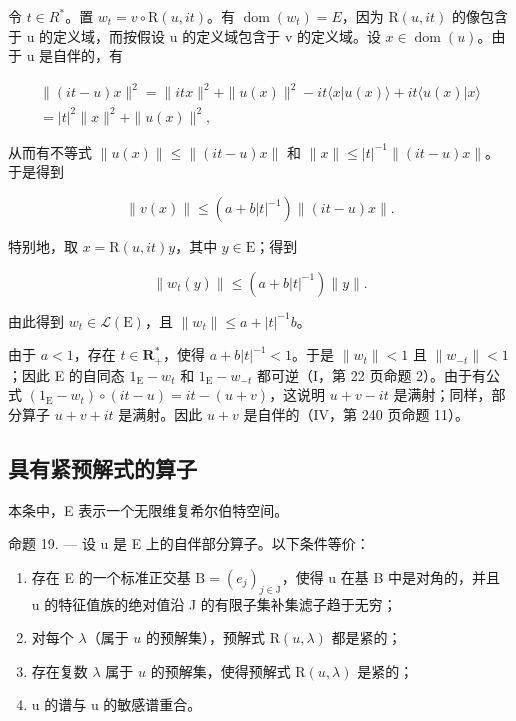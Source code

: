 令 \(t \in R^{*}\)。置 \(w_{t} = v \circ \mathrm{R}(u, it)\)。有 \(\operatorname{dom}(w_{t}) = E\)，因为 \(\mathrm{R}(u, it)\) 的像包含于 u 的定义域，而按假设 u 的定义域包含于 v 的定义域。设 \(x \in \operatorname{dom}(u)\)。由于 u 是自伴的，有

\[
\begin{array}{c} \| (i t - u) x \| ^ {2} = \| i t x \| ^ {2} + \| u (x) \| ^ {2} - i t \langle x | u (x) \rangle + i t \langle u (x) | x \rangle \\ = | t | ^ {2} \| x \| ^ {2} + \| u (x) \| ^ {2}, \end{array}
\]

从而有不等式 \(\|u(x)\|\leqslant\|(it-u)x\|\) 和 \(\|x\|\leqslant|t|^{-1}\|(it-u)x\|\)。于是得到

\[
\| v (x) \| \leqslant (a + b | t | ^ {- 1}) \| (i t - u) x \|.
\]

特别地，取 \(x = \mathrm{R}(u, it)y\)，其中 \(y \in \mathrm{E}\)；得到

\[
\| w _ {t} (y) \| \leqslant (a + b | t | ^ {- 1}) \| y \|.
\]

由此得到 \(w_{t}\in\mathcal{L}(\mathrm{E})\)，且 \(\|w_{t}\|\leqslant a+|t|^{-1}b\)。

由于 \(a < 1\)，存在 \(t \in \mathbf{R}_{+}^{*}\)，使得 \(a + b|t|^{-1} < 1\)。于是 \(\|w_{t}\| < 1\) 且 \(\|w_{-t}\| < 1\)；因此 E 的自同态 \(1_{\mathrm{E}} - w_{t}\) 和 \(1_{\mathrm{E}} - w_{-t}\) 都可逆（I，第 22 页命题 2）。由于有公式 \((1_{\mathrm{E}} - w_{t}) \circ (it - u) = it - (u + v)\)，这说明 \(u + v - it\) 是满射；同样，部分算子 \(u + v + it\) 是满射。因此 \(u + v\) 是自伴的（IV，第 240 页命题 11）。

\subsection{具有紧预解式的算子}

本条中，E 表示一个无限维复希尔伯特空间。

命题 19. --- 设 u 是 E 上的自伴部分算子。以下条件等价：

\begin{enumerate}
\def\labelenumi{(\roman{enumi})}
\item
  存在 E 的一个标准正交基 \(\mathrm{B} = (e_{j})_{j \in \mathrm{J}}\)，使得 u 在基 B 中是对角的，并且 u 的特征值族的绝对值沿 J 的有限子集补集滤子趋于无穷；
\item
  对每个 \(\lambda\)（属于 \(u\) 的预解集），预解式 \(\mathrm{R}(u,\lambda)\) 都是紧的；
\item
  存在复数 \(\lambda\) 属于 \(u\) 的预解集，使得预解式 \(\mathrm{R}(u,\lambda)\) 是紧的；
\item
  u 的谱与 u 的敏感谱重合。
\end{enumerate}

